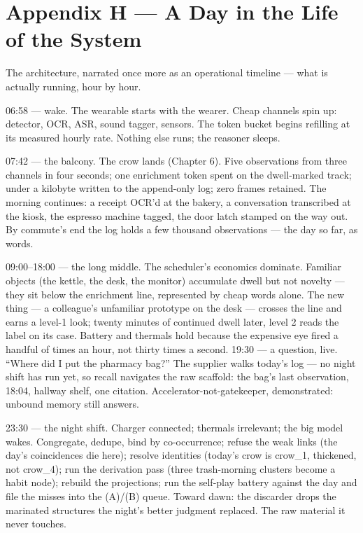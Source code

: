 \chapter*{Appendix H --- A Day in the Life of the System}\label{appendix-h-a-day-in-the-life-of-the-system}

The architecture, narrated once more as an operational timeline --- what is actually running, hour by hour.

06:58 --- wake. The wearable starts with the wearer. Cheap channels spin up: detector, OCR, ASR, sound tagger, sensors. The token bucket begins refilling at its measured hourly rate. Nothing else runs; the reasoner sleeps.

07:42 --- the balcony. The crow lands (Chapter 6). Five observations from three channels in four seconds; one enrichment token spent on the dwell-marked track; under a kilobyte written to the append-only log; zero frames retained. The morning continues: a receipt OCR'd at the bakery, a conversation transcribed at the kiosk, the espresso machine tagged, the door latch stamped on the way out. By commute's end the log holds a few thousand observations --- the day so far, as words.

09:00--18:00 --- the long middle. The scheduler's economics dominate. Familiar objects (the kettle, the desk, the monitor) accumulate dwell but not novelty --- they sit below the enrichment line, represented by cheap words alone. The new thing --- a colleague's unfamiliar prototype on the desk --- crosses the line and earns a level-1 look; twenty minutes of continued dwell later, level 2 reads the label on its case. Battery and thermals hold because the expensive eye fired a handful of times an hour, not thirty times a second. 19:30 --- a question, live. ``Where did I put the pharmacy bag?'' The supplier walks today's log --- no night shift has run yet, so recall navigates the raw scaffold: the bag's last observation, 18:04, hallway shelf, one citation. Accelerator-not-gatekeeper, demonstrated: unbound memory still answers.

23:30 --- the night shift. Charger connected; thermals irrelevant; the big model wakes. Congregate, dedupe, bind by co-occurrence; refuse the weak links (the day's coincidences die here); resolve identities (today's crow is crow\_1, thickened, not crow\_4); run the derivation pass (three trash-morning clusters become a habit node); rebuild the projections; run the self-play battery against the day and file the misses into the (A)/(B) queue. Toward dawn: the discarder drops the marinated structures the night's better judgment replaced. The raw material it never touches.

